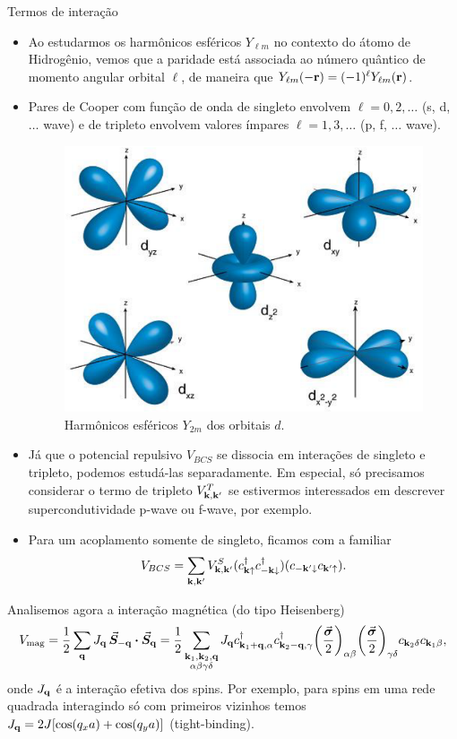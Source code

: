 \documentclass[a4paper,10pt]{article}
\begin{document}
\begin{section}{Termos de interação}


\begin{itemize}
\item Ao estudarmos os harmônicos esféricos $Y_{\ell m}$ no contexto do átomo de Hidrogênio, vemos que a paridade está associada ao número quântico de momento angular orbital $\ell$, de maneira que $Y_{\ell m}(-\vb{r}) = (-1)^\ell Y_{\ell m}(\vb{r})$.

\n

\item Pares de Cooper com função de onda de singleto envolvem $\ell = 0, 2, \ldots$ (s, d, $\ldots$ wave) e de tripleto envolvem valores ímpares $\ell = 1, 3, \ldots$ (p, f, $\ldots$ wave).

\begin{figure}[H]
\centering
\includegraphics[width=0.27\linewidth]{fig/d-orbitals.png}
\caption{Harmônicos esféricos $Y_{2m}$ dos orbitais $d$.}
\label{fig:d-orbitals}
\end{figure}

\item Já que o potencial repulsivo $V_{BCS}$ se dissocia em interações de singleto e tripleto, podemos estudá-las separadamente. Em especial, só precisamos considerar o termo de tripleto $V^T_{\vb{k},\vb{k}'}$ se estivermos interessados em descrever supercondutividade p-wave ou f-wave, por exemplo.

\n

\item Para um acoplamento somente de singleto, ficamos com a familiar
$$
V_{BCS} = \sum_{\vb{k},\vb{k}'} V_{\vb{k},\vb{k}'}^S (c_{\vb{k}\uparrow}^\dagger c_{-\vb{k}\downarrow}^\dagger) (c_{-\vb{k}'\downarrow} c_{\vb{k}'\uparrow}).
$$
\end{itemize}


Analisemos agora a interação magnética (do tipo Heisenberg)
$$
V_{\text{mag}} = \frac{1}{2} \sum_{\q} J_{\q} \, \va*{S}_{-\q} \vdot \va*{S}_{\q} =
\frac{1}{2} \sum_{\substack{\k_1,\k_2,\q \\ \alpha\beta\gamma\delta}} J_{\q} c_{\k_1+\q,\alpha}^\d c_{\k_2-\q,\gamma}^\d
\qty(\frac{\va*{\s}}{2})_{\alpha\beta} \qty(\frac{\va*{\s}}{2})_{\gamma\delta} c_{\k_2\delta} c_{\k_1\beta},
$$
onde $J_{\vb{q}}$ é a interação efetiva dos spins. Por exemplo, para spins em uma rede quadrada interagindo só com primeiros vizinhos temos $J_{\vb{q}} = 2 J [\cos(q_x a) + \cos(q_y a)]$ (tight-binding).


\end{section}
\end{document}
